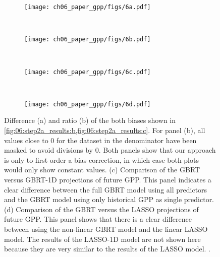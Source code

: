 \begin{figure}[!t]
  \centering
  \begin{subfigure}[b]{\SubfigureWidth{}}
    \texttt{[image: ch06\_paper\_gpp/figs/6a.pdf]}
    \caption{}
    \label{fig:06:step2a_results_biases:a}
  \end{subfigure}
  ~
  \begin{subfigure}[b]{\SubfigureWidth{}}
    \texttt{[image: ch06\_paper\_gpp/figs/6b.pdf]}
    \caption{}
    \label{fig:06:step2a_results_biases:b}
  \end{subfigure}
  \\
  \begin{subfigure}[b]{\SubfigureWidth{}}
    \texttt{[image: ch06\_paper\_gpp/figs/6c.pdf]}
    \caption{}
    \label{fig:06:step2a_results_biases:c}
  \end{subfigure}
  ~
  \begin{subfigure}[b]{\SubfigureWidth{}}
    \texttt{[image: ch06\_paper\_gpp/figs/6d.pdf]}
    \caption{}
    \label{fig:06:step2a_results_biases:d}
  \end{subfigure}
  \caption[
    Further illustrations of our \acl{ML} approach to constrain projected
    absolute \acf{GPP} at the end of the  century with observations in
    step 2a and comparison to other statistical models.
  ]{
    Difference (a) and ratio (b) of the both biases shown in
    \cref{fig:06:step2a_results:b,fig:06:step2a_results:c}. For panel (b), all
    values close to $0$ for the dataset in the denominator have been masked to
    avoid divisions by $0$. Both panels show that our approach is only to first
    order a bias correction, in which case both plots would only show constant
    values. (c) Comparison of the \acf{GBRT} versus \acs{GBRT}-1D projections
    of future \acf{GPP}. This panel indicates a clear difference between the
    full \acs{GBRT} model using all predictors and the \acs{GBRT} model using
    only historical \acs{GPP} as single predictor. (d) Comparison of the
    \acs{GBRT} versus the \acf{LASSO} projections of future \acs{GPP}. This
    panel shows that there is a clear difference between using the non-linear
    \acs{GBRT} model and the linear \acs{LASSO} model. The results of the
    \acs{LASSO}-1D model are not shown here because they are very similar to
    the results of the \acs{LASSO} model. .
  }
  \label{fig:06:step2a_results_biases}
\end{figure}

